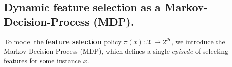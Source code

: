 

\subsection{Dynamic feature selection as a Markov-Decision-Process (MDP).}
To model the \textbf{feature selection} policy $\pi(x): \mathcal{X} \mapsto 2^\mathcal{H}$, we introduce the Markov Decision Process (MDP), which defines a single \emph{episode} of selecting features for some instance $x$.

